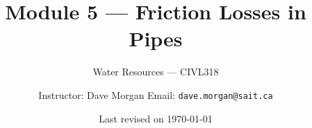 \documentclass[9pt,xcolor=x11names,professionalfonts, mathserif]{beamer}
\begin{document}
\title[Friction]{Module 5 --- Friction Losses in Pipes}
\subtitle[CIVL318]{Water Resources --- CIVL318}
\author{Instructor: Dave Morgan
\newline Email: \texttt{dave.morgan@sait.ca}
}
\date{\tiny \textcolor{blueGrey}{Last revised on \today}}


\begin{frame}[plain]    %
	\titlepage
\end{frame} 

\end{document}
